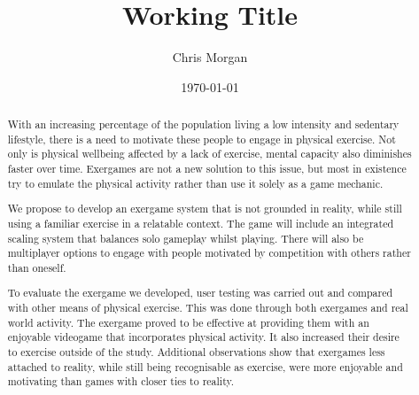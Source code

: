 \documentclass[11pt]{article}
\title{Working Title}
\author{Chris Morgan}
\date{\today}
\begin{document}
\maketitle

\begin{abstract}
With an increasing percentage of the population living a low intensity and sedentary lifestyle, there is a need to motivate these people to engage in physical exercise. Not only is physical wellbeing affected by a lack of exercise, mental capacity also diminishes faster over time. Exergames are not a new solution to this issue, but most in existence try to emulate the physical activity rather than use it solely as a game mechanic.

We propose to develop an exergame system that is not grounded in reality, while still using a familiar exercise in a relatable context. The game will include an integrated scaling system that balances solo gameplay whilst playing. There will also be multiplayer options to engage with people motivated by competition with others rather than oneself.

To evaluate the exergame we developed, user testing was carried out and compared with other means of physical exercise. This was done through both exergames and real world activity. The exergame proved to be effective at providing them with an enjoyable videogame that incorporates physical activity. It also increased their desire to exercise outside of the study. Additional observations show that exergames less attached to reality, while still being recognisable as exercise, were more enjoyable and motivating than games with closer ties to reality.
\end{abstract}

\clearpage
\end{document}
